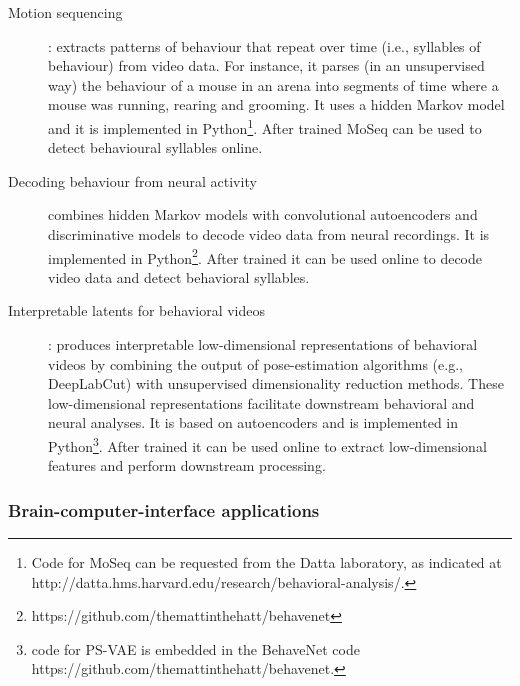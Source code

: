 \begin{description}

    \item[Motion sequencing]\citep[MoSeq;][]{wiltschkoEtAl15}: extracts patterns
        of behaviour that repeat over time (i.e., syllables of behaviour) from
        video data. For instance, it parses (in an unsupervised way) the
        behaviour of a mouse in an arena into segments of time where a mouse
        was running, rearing and grooming. It uses a hidden Markov model and it
        is implemented in Python\footnote{Code for MoSeq can be requested from
        the Datta laboratory, as indicated at
        http://datta.hms.harvard.edu/research/behavioral-analysis/.}.
        After trained MoSeq can be used to detect behavioural syllables online.

    \item[Decoding behaviour from neural
        activity]\citep[BehaveNet;][]{battyEtAl19} combines hidden Markov
        models with convolutional autoencoders and discriminative models to
        decode video data from neural recordings. It is implemented in
        Python\footnote{https://github.com/themattinthehatt/behavenet}.
        After trained it can be used online to decode video data and detect
        behavioral syllables.

    \item[Interpretable latents for behavioral videos]\citep[Partitioned
        Subspace Variational Autoencoder, PS-VAE;][]{whitewayEtAl21}: produces
        interpretable low-dimensional representations of behavioral videos by
        combining the output of pose-estimation algorithms (e.g., DeepLabCut)
        with unsupervised dimensionality reduction methods. These
        low-dimensional representations facilitate downstream behavioral and
        neural analyses. It is based on autoencoders and is implemented in
        Python\footnote{code for PS-VAE is embedded in the BehaveNet code
        https://github.com/themattinthehatt/behavenet.%
        }. After trained it can be used
        online to extract low-dimensional features and perform downstream
        processing.

\end{description}

\subsubsection{Brain-computer-interface applications}
\label{sec:bci}

